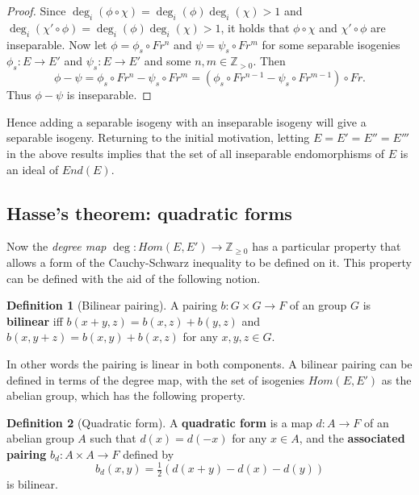 \documentclass{article}
\newcommand{\Z}{\mathbb{Z}}
\newcommand{\rb}[1]{\left( #1 \right)}
\theoremstyle{definition}\newtheorem*{definition}{Definition}
\theoremstyle{definition}\newtheorem*{example}{Example}
\theoremstyle{definition}\newtheorem*{remark}{Remark}
\begin{document}
\begin{proof}
Since $ \deg_i\rb{\phi \circ \chi} = \deg_i\rb{\phi}\deg_i\rb{\chi} > 1 $ and $ \deg_i\rb{\chi' \circ \phi} = \deg_i\rb{\phi}\deg_i\rb{\chi} > 1 $, it holds that $ \phi \circ \chi $ and $ \chi' \circ \phi $ are inseparable. Now let $ \phi = \phi_s \circ Fr^n $ and $ \psi = \psi_s \circ Fr^m $ for some separable isogenies $ \phi_s : E \to E' $ and $ \psi_s : E \to E' $ and some $ n, m \in \Z_{> 0} $. Then
$$ \phi - \psi = \phi_s \circ Fr^n - \psi_s \circ Fr^m = \rb{\phi_s \circ Fr^{n - 1} - \psi_s \circ Fr^{m - 1}} \circ Fr. $$
Thus $ \phi - \psi $ is inseparable.
\end{proof}

Hence adding a separable isogeny with an inseparable isogeny will give a separable isogeny. Returning to the initial motivation, letting $ E = E' = E'' = E''' $ in the above results implies that the set of all inseparable endomorphisms of $ E $ is an ideal of $ End\rb{E} $.

\pagebreak

\subsection{Hasse's theorem: quadratic forms}

Now the \emph{degree map} $ \deg : Hom\rb{E, E'} \to \Z_{\ge 0} $ has a particular property that allows a form of the Cauchy-Schwarz inequality to be defined on it. This property can be defined with the aid of the following notion.

\begin{definition}[Bilinear pairing]
A pairing $ b : G \times G \to F $ of an group $ G $ is \textbf{bilinear} iff $ b\rb{x + y, z} = b\rb{x, z} + b\rb{y, z} $ and $ b\rb{x, y + z} = b\rb{x, y} + b\rb{x, z} $ for any $ x, y, z \in G $.
\end{definition}

In other words the pairing is linear in both components. A bilinear pairing can be defined in terms of the degree map, with the set of isogenies $ Hom\rb{E, E'} $ as the abelian group, which has the following property.

\begin{definition}[Quadratic form]
A \textbf{quadratic form} is a map $ d : A \to F $ of an abelian group $ A $ such that $ d\rb{x} = d\rb{-x} $ for any $ x \in A $, and the \textbf{associated pairing} $ b_d : A \times A \to F $ defined by
$$ b_d\rb{x, y} = \tfrac{1}{2}\rb{d\rb{x + y} - d\rb{x} - d\rb{y}} $$
is bilinear.
\end{definition}
\end{document}
